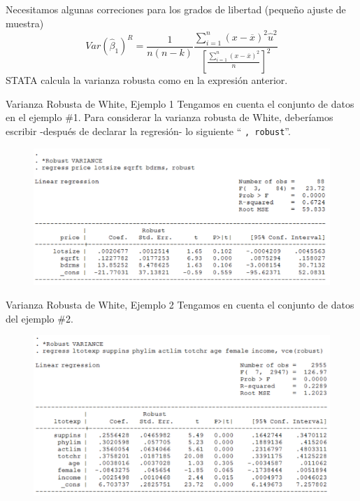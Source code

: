 \begin{frame}
	Necesitamos algunas correciones para los grados de libertad (pequeño ajuste de muestra)
		$$Var(\widehat{\beta}_1)^{R} = \frac{1}{n(n-k)} \frac{\sum_{i=1}^{n}(x - \overline{x})^2 \widehat{u}^2}{\left[\frac{\sum_{i=1}^{n}(x-\overline{x})^2}{n}\right]^2}$$
	STATA calcula la varianza robusta como en la expresión anterior.
\end{frame}
\begin{frame}{Varianza Robusta de White, Ejemplo 1}
	Tengamos en cuenta el conjunto de datos en el ejemplo \#1. Para considerar la varianza robusta de White, deberíamos escribir -después de declarar la regresión- lo siguiente ``		\colorbox{codegray}{\texttt{, robust}}''.
		\begin{figure}
			\centering
			\includegraphics[scale=.30]{fig/white1.png}
		\end{figure}
\end{frame}
\begin{frame}{Varianza Robusta de White, Ejemplo 2}
	Tengamos en cuenta el conjunto de datos del ejemplo \#2.
		\begin{figure}
			\centering
			\includegraphics[scale=.30]{fig/white2.png}
		\end{figure}
\end{frame}
